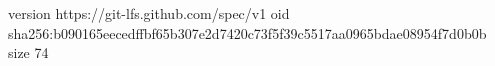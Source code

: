 version https://git-lfs.github.com/spec/v1
oid sha256:b090165eecedffbf65b307e2d7420c73f5f39c5517aa0965bdae08954f7d0b0b
size 74
